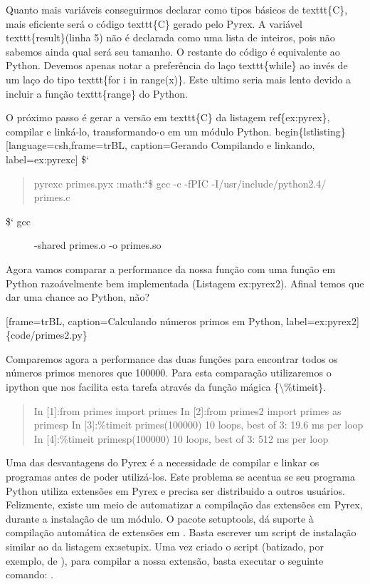 \documentclass[a4paper,10pt,portuguese]{sphinxmanual}
\begin{document}
Quanto mais variáveis conseguirmos declarar como tipos básicos de texttt\{C\}, mais eficiente será o código texttt\{C\} gerado pelo Pyrex. A variável texttt\{result\}(linha 5) não é declarada como uma lista de inteiros, pois não sabemos ainda qual será seu tamanho. O restante do código é equivalente ao Python. Devemos apenas notar a preferência do laço texttt\{while\} ao invés de um laço do tipo texttt\{for i in range(x)\}. Este ultimo seria mais lento devido a incluir a função texttt\{range\} do Python.

O próximo passo é gerar a versão em texttt\{C\} da listagem ref\{ex:pyrex\}, compilar e linká-lo, transformando-o em um módulo Python.
begin\{lstlisting\}{[}language=csh,frame=trBL, caption=Gerando Compilando e linkando, label=ex:pyrexc{]}
\${}`
\begin{quote}

pyrexc primes.pyx
:math:{\color{red}\bfseries{}{}`}\$ gcc -c -fPIC -I/usr/include/python2.4/ primes.c
\end{quote}
\begin{description}
\item[{\${}` gcc}] \leavevmode
-shared primes.o -o primes.so

\end{description}

Agora vamos comparar a performance da nossa função com uma função
em Python razoávelmente bem implementada (Listagem ex:pyrex2).
Afinal temos que dar uma chance ao Python, não?

{[}frame=trBL, caption=Calculando números primos em Python, label=ex:pyrex2{]} \{code/primes2.py\}

Comparemos agora a performance das duas funções para encontrar
todos os números primos menores que 100000. Para esta comparação
utilizaremos o ipython que nos facilita esta tarefa através da
função mágica \{\textbackslash{}\%timeit\}.
\begin{quote}

In {[}1{]}:from primes import primes In {[}2{]}:from primes2 import primes
as primesp In {[}3{]}:\%timeit primes(100000) 10 loops, best of 3: 19.6
ms per loop In {[}4{]}:\%timeit primesp(100000) 10 loops, best of 3: 512
ms per loop
\end{quote}

Uma das desvantagens do Pyrex é a necessidade de compilar e linkar
os programas antes de poder utilizá-los. Este problema se acentua
se seu programa Python utiliza extensões em Pyrex e precisa ser
distribuido a outros usuários. Felizmente, existe um meio de
automatizar a compilação das extensões em Pyrex, durante a
instalação de um módulo. O pacote setuptools, dá suporte à
compilação automática de extensões em . Basta escrever um
script de instalação similar ao da listagem ex:setupix. Uma vez
criado o script (batizado, por exemplo, de ), para
compilar a nossa extensão, basta executar o seguinte comando:
.
\end{document}
